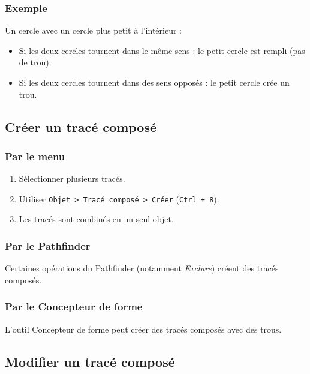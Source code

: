 \subsubsection{Exemple}

Un cercle avec un cercle plus petit à l'intérieur :

\begin{itemize}
    \item Si les deux cercles tournent dans le même sens : le petit cercle est rempli (pas de trou).
    \item Si les deux cercles tournent dans des sens opposés : le petit cercle crée un trou.
\end{itemize}

\subsection{Créer un tracé composé}

\subsubsection{Par le menu}

\begin{enumerate}
    \item Sélectionner plusieurs tracés.
    \item Utiliser \texttt{Objet > Tracé composé > Créer} (\texttt{Ctrl + 8}).
    \item Les tracés sont combinés en un seul objet.
\end{enumerate}

\subsubsection{Par le Pathfinder}

Certaines opérations du Pathfinder (notamment \emph{Exclure}) créent des tracés composés.

\subsubsection{Par le Concepteur de forme}

L'outil Concepteur de forme peut créer des tracés composés avec des trous.

\subsection{Modifier un tracé composé}

